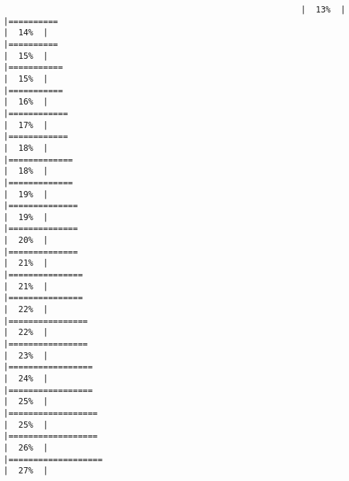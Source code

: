 \documentclass[
]{article}
\begin{document}
\begin{verbatim}
                                                            |  13%  |                                                                              |==========                                                            |  14%  |                                                                              |==========                                                            |  15%  |                                                                              |===========                                                           |  15%  |                                                                              |===========                                                           |  16%  |                                                                              |============                                                          |  17%  |                                                                              |============                                                          |  18%  |                                                                              |=============                                                         |  18%  |                                                                              |=============                                                         |  19%  |                                                                              |==============                                                        |  19%  |                                                                              |==============                                                        |  20%  |                                                                              |==============                                                        |  21%  |                                                                              |===============                                                       |  21%  |                                                                              |===============                                                       |  22%  |                                                                              |================                                                      |  22%  |                                                                              |================                                                      |  23%  |                                                                              |=================                                                     |  24%  |                                                                              |=================                                                     |  25%  |                                                                              |==================                                                    |  25%  |                                                                              |==================                                                    |  26%  |                                                                              |===================                                                   |  27%  |                                                                              
\end{verbatim}
\end{document}
